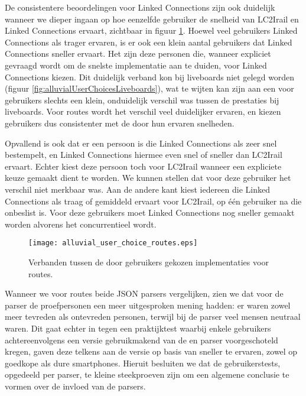 De consistentere beoordelingen voor Linked Connections zijn ook duidelijk wanneer we dieper ingaan op hoe eenzelfde gebruiker de snelheid van LC2Irail en Linked Connections ervaart, zichtbaar in figuur \ref{fig:alluvialUserChoicesRoutes}. Hoewel veel gebruikers Linked Connections als trager ervaren, is er ook een klein aantal gebruikers dat Linked Connections sneller ervaart. Het zijn deze personen die, wanneer expliciet gevraagd wordt om de snelste implementatie aan te duiden, voor Linked Connections kiezen. Dit duidelijk verband kon bij liveboards niet gelegd worden (figuur \ref{fig:alluvialUserChoicesLiveboards}), wat te wijten kan zijn aan een voor gebruikers slechts een klein, onduidelijk verschil was tussen de prestaties bij liveboards. Voor routes wordt het verschil veel duidelijker ervaren, en kiezen gebruikers dus consistenter met de door hun ervaren snelheden.

Opvallend is ook dat er een persoon is die Linked Connections als zeer snel bestempelt, en Linked Connections hiermee even snel of sneller dan LC2Irail ervaart. Echter kiest deze persoon toch voor LC2Irail wanneer een expliciete keuze gemaakt dient te worden. We kunnen stellen dat voor deze gebruiker het verschil niet merkbaar was. Aan de andere kant kiest iedereen die Linked Connections als traag of gemiddeld ervaart voor LC2Irail, op één gebruiker na die onbeslist is. Voor deze gebruikers moet Linked Connections nog sneller gemaakt worden alvorens het concurrentieel wordt.

\begin{figure}[ht]
	\centering
	\texttt{[image: alluvial\_user\_choice\_routes.eps]}
	\caption[Door gebruikers gekozen implementatie voor routes]{Verbanden tussen de door gebruikers gekozen implementaties voor routes. }
	\label{fig:alluvialUserChoicesRoutes}
\end{figure}

Wanneer we voor routes beide JSON parsers vergelijken, zien we dat voor de  parser de proefpersonen een meer uitgesproken mening hadden: er waren zowel meer tevreden als ontevreden personen, terwijl bij de  parser veel mensen neutraal waren. Dit gaat echter in tegen een praktijktest waarbij enkele gebruikers achtereenvolgens een versie gebruikmakend van de  en  parser voorgeschoteld kregen, gaven deze telkens aan de versie op basis van  sneller te ervaren, zowel op goedkope als dure smartphones. Hieruit besluiten we dat de gebruikerstests, opgedeeld per parser, te kleine steekproeven zijn om een algemene conclusie te vormen over de invloed van de parsers.

